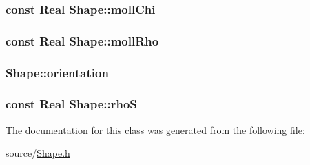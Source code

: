 \subsubsection[{moll\+Chi}]{\setlength{\rightskip}{0pt plus 5cm}const {\bf Real} Shape\+::moll\+Chi\hspace{0.3cm}{\ttfamily [protected]}}\label{class_shape_ad7d270a8ffc4056d4990424dffdd0488}
\hypertarget{class_shape_af5aa25175d49bc463fada7b11f2735e1}{}
\subsubsection[{moll\+Rho}]{\setlength{\rightskip}{0pt plus 5cm}const {\bf Real} Shape\+::moll\+Rho\hspace{0.3cm}{\ttfamily [protected]}}\label{class_shape_af5aa25175d49bc463fada7b11f2735e1}
\hypertarget{class_shape_a1778439509ada1f3fa64472610221d19}{}
\subsubsection[{orientation}]{ Shape\+::orientation\hspace{0.3cm}{\ttfamily [protected]}}\label{class_shape_a1778439509ada1f3fa64472610221d19}
\hypertarget{class_shape_a181acdc3063f20a15ba1807f7b6a5d10}{}
\subsubsection[{rho\+S}]{\setlength{\rightskip}{0pt plus 5cm}const {\bf Real} Shape\+::rho\+S\hspace{0.3cm}{\ttfamily [protected]}}\label{class_shape_a181acdc3063f20a15ba1807f7b6a5d10}


The documentation for this class was generated from the following file\+:\begin{DoxyCompactItemize}
\item 
source/\hyperlink{_shape_8h}{Shape.\+h}\end{DoxyCompactItemize}
